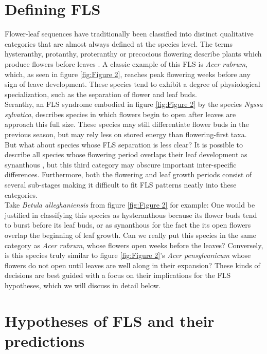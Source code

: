 \documentclass[12pt]{article}\usepackage[]{graphicx}\usepackage[]{color}
\begin{document}
\section*{Defining FLS}
\indent\indent Flower-leaf sequences have traditionally been classified into distinct qualitative categories that are almost always defined at the species level. The terms hysteranthy, protanthy, proteranthy or precocious flowering describe plants which produce flowers before leaves \citep{Lamont2011, Heinig1899}. A classic example of this FLS is \textit{Acer rubrum}, which, as seen in figure \ref{fig:Figure 2}, reaches peak flowering weeks before any sign of leave development. These species tend to exhibit a degree of physiological specialization, such as the separation of flower and leaf buds. \\
\indent Seranthy, an FLS syndrome embodied in figure \ref{fig:Figure 2} by the species \textit{Nyssa sylvatica}, describes species in which flowers begin to open after leaves are approach this full size. These species may still differentiate flower buds in the previous season, but may rely less on stored energy than flowering-first taxa.\\
\indent But what about species whose FLS separation is less clear? It is possible to describe all species whose flowering period overlaps their leaf development as synanthous \citep{Lamont2011}, but this third category may obscure important inter-specific differences. Furthermore, both the flowering and leaf growth periods consist of several sub-stages making it difficult to fit FLS patterns neatly into these categories.\\
 \indent Take \textit{Betula alleghaniensis} from figure \ref{fig:Figure 2} for example: One would be justified in classifying this species as hysteranthous because its flower buds tend to burst before its leaf buds, or as synanthous for the fact the its open flowers overlap the beginning of leaf growth. Can we really put this species in the same category as \textit{Acer rubrum}, whose flowers open weeks before the leaves? Conversely, is this species truly similar to figure \ref{fig:Figure 2}'s \textit{Acer pensylvanicum} whose flowers do not open until leaves are well along in their expansion?  These kinds of decisions are best guided with a focus on their implications for the FLS hypotheses, which we will discuss in detail below. 
\section*{Hypotheses of FLS and their predictions}
\end{document}
